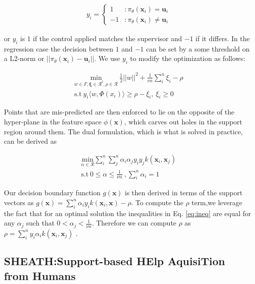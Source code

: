 \documentclass[10pt, conference]{ieeeconf}      %
\newcommand{\bu}{\mathbf{u}}
\newcommand{\bx}{\mathbf{x}}
\newcommand{\mR}{\mathcal{R}}
\begin{document}
\begin{align}
y_i = \left\{
     \begin{array}{lr}
       1 & : \pi_{\theta}(\bx_i) =\bu_i\\
       -1 & : \pi_{\theta}(\bx_i) \neq \bu_i
     \end{array}
   \right.
\end{align}

or $y_i$ is $1$ if the control applied matches the supervisor and $-1$ if it differs. In the regression case the decision between $1$ and $-1$ can be set by a some threshold on a L2-norm or $||\pi_{\theta}(\bx_i)-\bu_i||$. We use $y_i$ to modify the optimization as follows: 

\vspace{-2ex}
\begin{align}\label{eq:primal_sup}
\underset{w\in F, \mathbf{\xi} \in \mR^l, \rho \in \mR}{\mbox{min}}\: \frac{1}{2}||w||^2+\frac{1}{vn} \sum^n_i \xi_i - \rho\\
\mbox{s.t} \: y_i \langle w,\Phi(x_i)\rangle \geq \rho - \xi_i, \: \xi_i \geq 0 \label{eq:ineq}
\end{align}

Points that are mis-predicted are then enforced to lie on the opposite of the hyper-plane in the feature space $\phi(\bx)$, which carves out holes in the support region around them. The dual formulation, which is what is solved in practice, can be derived as 

\vspace{-2ex}
\begin{align}\label{eq:dual_sup}
\underset{\alpha\in \mathcal{R}}{\mbox{min}} \sum_i^n \sum_j^n \alpha_i\alpha_j y_i y_jk(\bx_i,\bx_j)\\
\mbox{s.t} \: 0 \leq \alpha \leq \frac{1}{\nu n} \:, \sum_i^n \alpha_i = 1 
\end{align}

Our decision boundary function $g(\bx)$ is then derived in terms of the support vectors as $g(\bx) = \sum_i^n \alpha_i y_i k(\bx_i,\bx) - \rho$. To compute the $\rho$ term,we leverage the fact that for an optimal solution the inequalities in Eq. \ref{eq:ineq} are equal for any $\alpha_j$ such that $0 < \alpha_j < \frac{1}{\nu n}$. Therefore we can compute $\rho$ as  $\rho = \sum_i^n y_i \alpha_i k(\bx_i,\bx_j)$ \cite{scholkopf2001estimating}. 




\subsection{SHEATH:Support-based HElp AquisiTion from Humans}
\end{document}
